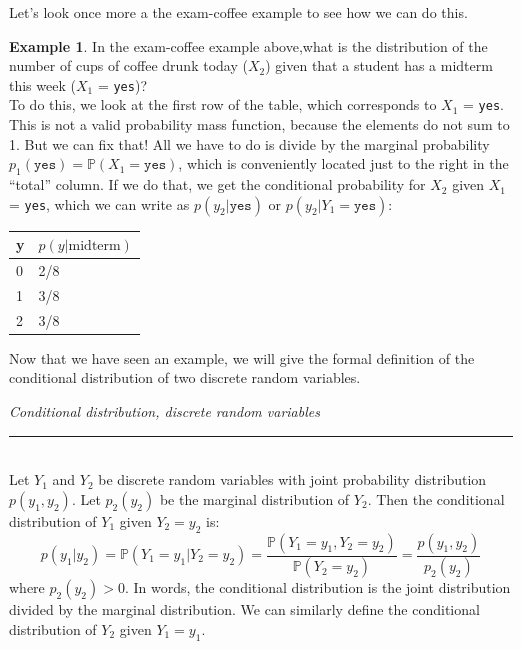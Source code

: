 \documentclass[12pt]{article}
\theoremstyle{definition}
\newtheorem*{example}{Example}
\theoremstyle{remark}
\def\P{{\mathbb P}}
\begin{document}
Let's look once more a the exam-coffee example to see how we can do this.

\begin{example}
In the exam-coffee example above,what is the distribution of the number of cups of coffee drunk today ($X_2$) given that a student has a midterm this week ($X_1$ = \texttt{yes})?\\

To do this, we look at the first row of the table, which corresponds to $X_1$ = \texttt{yes}. This is not a valid probability mass function, because the elements do not sum to 1. But we can fix that! All we have to do is divide by the marginal probability $p_1(\texttt{yes}) = \P(X_1 = \texttt{yes})$, which is conveniently located just to the right in the ``total'' column. If we do that, we get the conditional probability for $X_2$ given $X_1$ = \texttt{yes}, which we can write as $p(y_2 | \texttt{yes})$ or $p(y_2 | Y_1 = \texttt{yes})$:

\begin{table}[H]
\centering
\begin{tabular}{@{}ll@{}}
\toprule
y & $p(y | \text{midterm})$ \\ \midrule
0 & 2/8                                  \\
1 & 3/8                                  \\
2 & 3/8                                \\ \bottomrule
\end{tabular}
\end{table}
\end{example}

Now that we have seen an example, we will give the formal definition of the conditional distribution of two discrete random variables.

\begin{framed}
\emph{Conditional distribution, discrete random variables}\\
  \rule{\dimexpr{}\fboxrule}{.1pt} \\
Let $Y_1$ and $Y_2$ be discrete random variables with joint probability distribution $p(y_1, y_2)$. Let $p_2(y_2)$ be the marginal distribution of $Y_2$. Then the conditional distribution of $Y_1$ given $Y_2 = y_2$ is:
\[
p(y_1|y_2) = \P(Y_1 = y_1|Y_2 = y_2) = \frac{\P(Y_1 = y_1, Y_2 = y_2)}{\P(Y_2 = y_2)} = \frac{p(y_1, y_2)}{p_2(y_2)}
\]
where $p_2(y_2) > 0$. In words, the conditional distribution is the joint distribution divided by the marginal distribution. We can similarly define the conditional distribution of $Y_2$ given $Y_1 = y_1$.
\end{framed}
\end{document}
